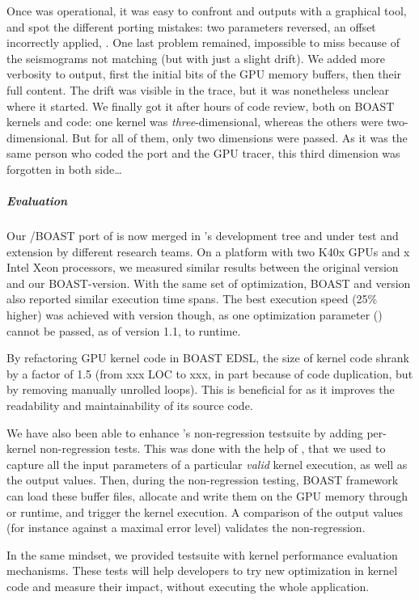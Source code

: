 Once  was operational, it was easy to confront \Cuda
and \OCL outputs with a graphical  tool, and spot the
different porting mistakes: two parameters reversed, an offset
incorrectly applied, \etc. One last problem remained, impossible to
miss because of the seismograms not matching (but with just a slight
drift). We added more verbosity to  output, first the
initial bits of the GPU memory buffers, then their full content. The
drift was visible in the trace, but it was nonetheless unclear where
it started. We finally got it after hours of code review, both on
BOAST kernels and \OCL code: one kernel was \emph{three}-dimensional,
whereas the others were two-dimensional. But for all of them, only two
dimensions were passed. As it was the same person who coded the \OCL
port and the GPU tracer, this third dimension was forgotten in both
side\ldots

\subparagraph{Evaluation} Our \OCL/BOAST port of \Specfem is now
merged in \Specfem's development tree and under test and extension by
different research teams. On a platform with two K40x GPUs and x Intel
Xeon processors, we measured similar results between the original
\Cuda version and our BOAST-\Cuda version. With the same set of
optimization, BOAST \Cuda and \OCL version also reported similar
execution time spans. The best execution speed (25\% higher) was
achieved with \Cuda version though, as one optimization parameter
() cannot be passed, as of version 1.1, to
\OCL runtime.

By refactoring GPU kernel code in BOAST EDSL, the size of kernel code
shrank by a factor of 1.5 (from xxx LOC to xxx, in part because of
code duplication, but by removing manually unrolled loops). This is
beneficial for \Specfem as it improves the readability and
maintainability of its source code.

We have also been able to enhance \Specfem's non-regression testsuite
by adding per-kernel non-regression tests. This was done with the help
of , that we used to capture all the input parameters
of a particular \emph{valid} kernel execution, as well as the output
values. Then, during the non-regression testing, BOAST framework can
load these buffer files, allocate and write them on the GPU memory
through \Cuda or \OCL runtime, and trigger the kernel execution. A
comparison of the output values (for instance against a maximal error
level) validates the non-regression.

In the same mindset, we provided \Specfem testsuite with kernel
performance evaluation mechanisms. These tests will help developers to
try new optimization in kernel code and measure their impact, without
executing the whole application.

